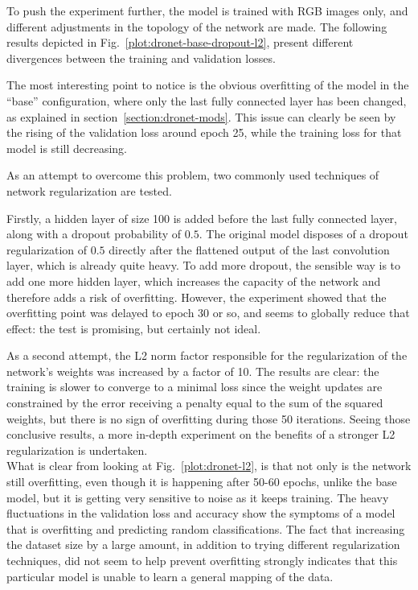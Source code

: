 To push the experiment further, the model is trained with RGB images only, and
different adjustments in the topology of the network are made. The following
results depicted in Fig.~\ref{plot:dronet-base-dropout-l2}, present different
divergences between the training and validation losses.



The most interesting point to notice is the obvious overfitting of the model
in the ``base'' configuration, where only the last fully connected layer has
been changed, as explained in section~\ref{section:dronet-mods}. This issue can
clearly be seen by the rising of the validation loss around epoch 25, while the
training loss for that model is still decreasing.

As an attempt to overcome this problem, two commonly used techniques of network
regularization are tested.

Firstly, a hidden layer of size 100 is added before the last fully connected
layer, along with a dropout probability of $0.5$. The original model disposes
of a dropout regularization of $0.5$ directly after the flattened output of the
last convolution layer, which is already quite heavy. To add more dropout, the
sensible way is to add one more hidden layer, which increases the capacity of
the network and therefore adds a risk of overfitting. However, the experiment
showed that the overfitting point was delayed to epoch 30 or so, and seems to
globally reduce that effect: the test is promising, but certainly not ideal.


As a second attempt, the L2 norm factor responsible for the regularization of
the network's weights was increased by a factor of 10. The results are clear:
the training is slower to converge to a minimal loss since the weight updates
are constrained by the error receiving a penalty equal to the sum of the
squared weights, but there is no sign of overfitting during those 50
iterations. Seeing those conclusive results, a more in-depth experiment on the
benefits of a stronger L2 regularization is undertaken.\\



What is clear from looking at Fig.~\ref{plot:dronet-l2}, is that not only is
the network still overfitting, even though it is happening after 50-60 epochs,
unlike the base model, but it is getting very sensitive to noise as it keeps
training. The heavy fluctuations in the validation loss and accuracy show the
symptoms of a model that is overfitting and predicting random classifications.
The fact that increasing the dataset size by a large amount, in addition to
trying different regularization techniques, did not seem to help prevent
overfitting strongly indicates that this particular model is unable to learn a
general mapping of the data.\\

